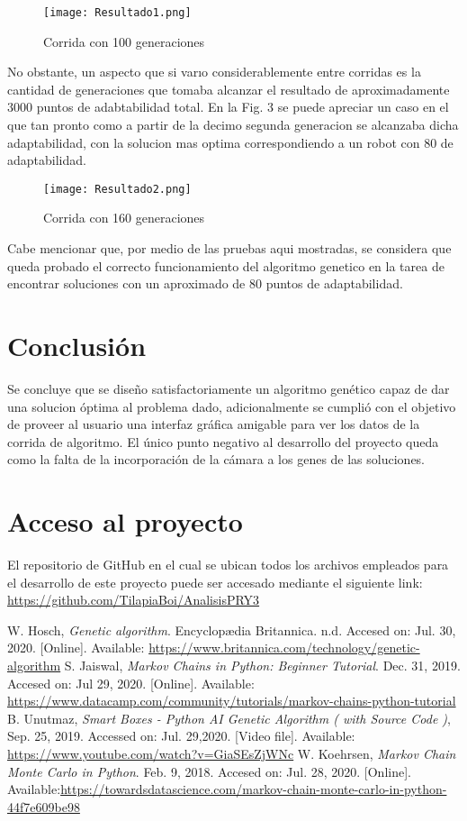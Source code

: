 \documentclass[conference]{IEEEtran}
\begin{document}
\begin{figure}[htbp]
\centerline{\texttt{[image: Resultado1.png]}}
\caption{Corrida con 100 generaciones}
\label{Imagen de referencia}
\end{figure}

No obstante, un aspecto que si varıo considerablemente entre corridas es la cantidad de generaciones que tomaba alcanzar el resultado de aproximadamente 3000 puntos de adabtabilidad total. En la Fig. 3 se puede apreciar un caso en el que tan pronto como a partir de la decimo segunda generacion se alcanzaba dicha adaptabilidad, con la solucion mas optima correspondiendo a un robot con 80 de adaptabilidad.

\begin{figure}[htbp]
\centerline{\texttt{[image: Resultado2.png]}}
\caption{Corrida con 160 generaciones}
\label{50 muestras completo}
\end{figure}

Cabe mencionar que, por medio de las pruebas aqui mostradas, se considera que queda probado el correcto funcionamiento del algoritmo genetico en la tarea de encontrar soluciones con un aproximado de 80 puntos de adaptabilidad.

\section{Conclusión}

Se concluye que se diseño satisfactoriamente un algoritmo genético capaz de dar una solucion óptima al problema dado, adicionalmente se cumplió con el objetivo de proveer al usuario una interfaz gráfica amigable para ver los datos de  la corrida de algoritmo. El único punto negativo al desarrollo del proyecto queda como la falta de la incorporación de la cámara a los genes de las soluciones.

\section{Acceso al proyecto}
El repositorio de GitHub en el cual se ubican todos los archivos empleados para el desarrollo de este proyecto puede ser accesado mediante el siguiente link: \url{https://github.com/TilapiaBoi/AnalisisPRY3}

\begin{thebibliography}{00}
 W. Hosch, \textit{Genetic algorithm}. Encyclopædia Britannica. n.d. Accesed on: Jul. 30, 2020. [Online]. Available: \url{https://www.britannica.com/technology/genetic-algorithm}
 S. Jaiswal, \textit{Markov Chains in Python: Beginner Tutorial}. Dec. 31, 2019. Accesed on: Jul 29, 2020. [Online]. Available: \url{https://www.datacamp.com/community/tutorials/markov-chains-python-tutorial}
 B. Unutmaz, \textit{Smart Boxes - Python AI Genetic Algorithm ( with Source Code )}, Sep. 25, 2019. Accessed on: Jul. 29,2020. [Video file]. Available: \url{ https://www.youtube.com/watch?v=GiaSEsZjWNc}
 W. Koehrsen, \textit{Markov Chain Monte Carlo in Python}. Feb. 9, 2018. Accesed on: Jul. 28, 2020. [Online]. Available:\url{https://towardsdatascience.com/markov-chain-monte-carlo-in-python-44f7e609be98}
\end{thebibliography}
\end{document}
